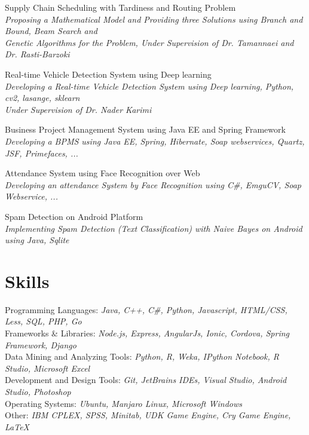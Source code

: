\documentclass[a4paper,10pt]{article}
\newcommand{\skillItem}[2]{
	\textbullet\textnormal{ #1: }\emph{\color{darkgray}\small #2}}
\newcommand{\projectTitle}[1]{
	\textbullet\textnormal{ #1}}
\newcommand{\projectSubTitle}[1]{
	\emph{\color{darkgray}\small {\space\space\space\space\space}#1}}
\newcommand{\latexLogo}{
	{\fb \LaTeX}\setmainfont[SmallCapsFont=Fontin-SmallCaps.otf]{Fontin.otf}}
\begin{document}
		\projectTitle{ Supply Chain Scheduling with Tardiness and Routing Problem} \\
		\projectSubTitle{Proposing a Mathematical Model and Providing three Solutions using Branch and Bound, Beam Search and }\\
		\projectSubTitle{Genetic Algorithms for the Problem, Under Supervision of Dr. Tamannaei and Dr. Rasti-Barzoki}\vspace{1 mm}
		
		\projectTitle{ Real-time Vehicle Detection System using Deep learning} \\
		\projectSubTitle{Developing a Real-time Vehicle Detection System using Deep learning, Python, cv2, lasange, sklearn}\\
		\projectSubTitle{Under Supervision of Dr. Nader Karimi}\vspace{1 mm}
		
		\projectTitle{ Business Project Management System using Java EE and Spring Framework} \\
		\projectSubTitle{Developing a BPMS using Java EE, Spring, Hibernate, Soap webservices, Quartz, JSF, Primefaces, ...} \vspace{1 mm}
		
		\projectTitle{ Attendance System using Face Recognition over Web} \\
		\projectSubTitle{Developing an attendance System by Face Recognition using C\#, EmguCV, Soap Webservice, ...} \vspace{1 mm}
		

		\projectTitle{ Spam Detection on Android Platform} \\
		\projectSubTitle{Implementing Spam Detection (Text Classification) with Naive Bayes on Android using Java, Sqlite} \vspace{1 mm}
	\section{Skills}
		\skillItem{Programming Languages}{Java, C++, {C\#}, Python, Javascript, HTML/CSS, Less, SQL, PHP, Go}\vspace{1 mm}\\
		\skillItem{Frameworks \& Libraries}{Node.js, Express, AngularJs, Ionic, Cordova, Spring Framework, Django}\vspace{1 mm}\\
		\skillItem{Data Mining and Analyzing Tools}{Python, R, Weka, IPython Notebook, R Studio, Microsoft Excel}\vspace{1 mm}\\
		\skillItem{Development and Design Tools}{Git, JetBrains IDEs, Visual Studio, Android Studio, Photoshop}\vspace{1 mm}\\
		\skillItem{Operating Systems}{Ubuntu, Manjaro Linux, Microsoft Windows}\vspace{1 mm}\\
		\skillItem{Other}{IBM CPLEX, SPSS, Minitab, UDK Game Engine, Cry Game Engine, \latexLogo}\vspace{1 mm}
	 
\end{document}
